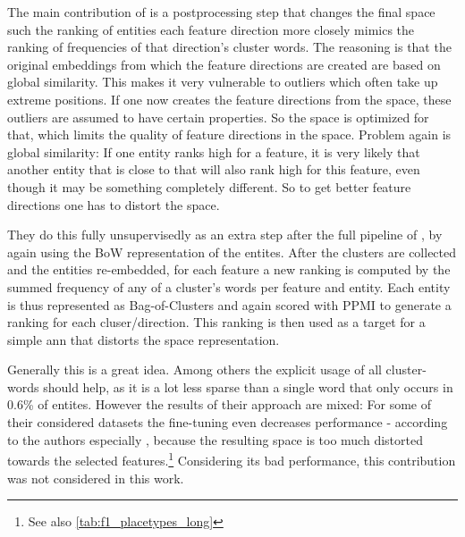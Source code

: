 The main contribution of \textcite{Ager2018} is a postprocessing step that changes the final space such the ranking of entities \wrt each feature direction more closely mimics the ranking of frequencies of that direction's cluster words. The reasoning is that the original embeddings from which the feature directions are created are based on global similarity. This makes it very vulnerable to outliers which often take up extreme positions. If one now creates the feature directions from the space, these outliers are assumed to have certain properties. So the space is optimized for that, which limits the quality of feature directions in the space. Problem again is global similarity: If one entity ranks high for a feature, it is very likely that another entity that is close to that will also rank high for this feature, even though it may be something completely different. So to get better feature directions one has to distort the space. 

They do this fully unsupervisedly as an extra step after the full pipeline of \cite{Derrac2015}, by again using the BoW representation of the entites. After the clusters are collected and the entities re-embedded, for each feature a new ranking is computed by the summed frequency of any of a cluster's words per feature and entity. Each entity is thus represented as Bag-of-Clusters and again scored with PPMI to generate a ranking for each cluser/direction. This ranking is then used as a target for a simple \gls{ann} that distorts the space representation.

Generally this is a great idea. Among others the explicit usage of all cluster-words should help, as it is a lot less sparse than a single word that only occurs in 0.6\% of entites. However the results of their approach are mixed: For some of their considered datasets the fine-tuning even decreases performance - according to the authors especially  \cite{Ager2018}, because the resulting space is too much distorted towards the selected features.\footnote{See also \autoref{tab:f1_placetypes_long}} Considering its bad performance, this contribution was not considered in this work.

\textcite{Alshaikh2020}

\todo

